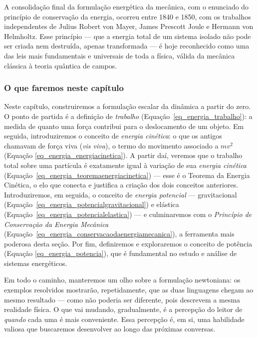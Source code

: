  
A consolidação final da formulação energética da mecânica, com o enunciado do
princípio de conservação da energia, ocorreu entre 1840 e 1850, com os trabalhos
independentes de Julius Robert von Mayer, James Prescott Joule e Hermann von
Helmholtz. Esse princípio --- que a energia total de um sistema isolado não pode ser
criada nem destruída, apenas transformada --- é hoje reconhecido como uma das leis
mais fundamentais e universais de toda a física, válida da mecânica clássica à teoria
quântica de campos.
 
\subsubsection*{O que faremos neste capítulo}
 
Neste capítulo, construiremos a formulação escalar da dinâmica a partir do zero. O
ponto de partida é a definição de \textit{trabalho} (Equação~\ref{eq_energia_trabalho}): a
medida de quanto uma força contribui para o deslocamento de um objeto. Em seguida, introduziremos o conceito de \textit{energia cinética}: o que os antigos chamavam de força viva (\textit{vis viva}), o termo do movimento associado a $mv^2$ (Equação \ref{eq_energia_energiacinetica}). A partir daí,
veremos que o trabalho total sobre uma partícula é exatamente igual à variação de
sua \textit{energia cinética} (Equação~\ref{eq_energia_teoremaenergiacinetica}) --- esse é o Teorema da Energia
Cinética, o elo que conecta e justifica a criação dos dois conceitos anteriores. Introduziremos, em seguida, o
conceito de \textit{energia potencial} --- gravitacional (Equação~\ref{eq_energia_potencialgravitacional}) e 
elástica (Equação~\ref{eq_energia_potencialelastica}) --- e culminaremos com o \textit{Princípio de
Conservação da Energia Mecânica} (Equação~\ref{eq_energia_conservacaodaenergiamecanica}), a ferramenta mais poderosa desta seção. Por fim, definiremos e exploraremos o conceito de potência (Equação \ref{eq_energia_potencia}), que é fundamental no estudo e análise de sistemas energéticos.
 
Em todo o caminho, manteremos um olho sobre a formulação newtoniana: os exemplos
resolvidos mostrarão, repetidamente, que as duas linguagens chegam ao mesmo resultado
--- como não poderia ser diferente, pois descrevem a mesma realidade física. O que
vai mudando, gradualmente, é a percepção do leitor de \textit{quando} cada uma é
mais conveniente. Essa percepção é, em si, uma habilidade valiosa que buscaremos desenvolver ao longo das próximas conversas.













